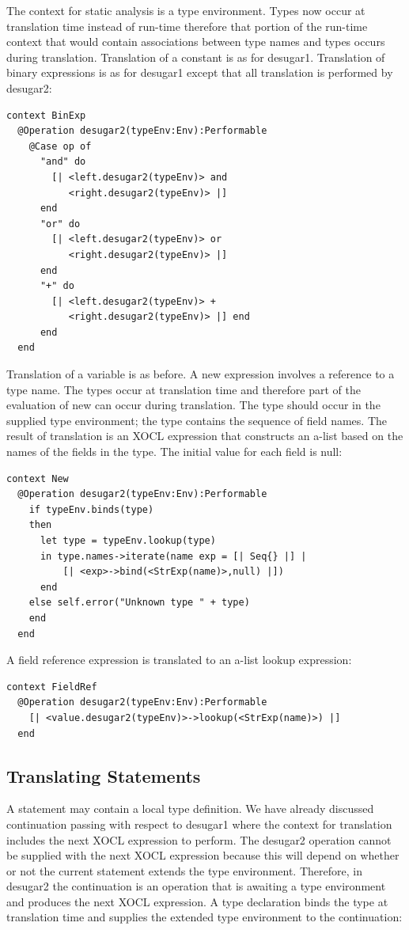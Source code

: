 The context for static analysis is a type environment. Types now occur
at translation time instead of run-time therefore that portion of
the run-time context that would contain associations between type
names and types occurs during translation. Translation of a constant
is as for desugar1. Translation of binary expressions is as for desugar1
except that all translation is performed by desugar2:

\begin{lstlisting}
context BinExp
  @Operation desugar2(typeEnv:Env):Performable
    @Case op of
      "and" do 
        [| <left.desugar2(typeEnv)> and
           <right.desugar2(typeEnv)> |] 
      end
      "or" do 
        [| <left.desugar2(typeEnv)> or 
           <right.desugar2(typeEnv)> |] 
      end 
      "+" do 
        [| <left.desugar2(typeEnv)> + 
           <right.desugar2(typeEnv)> |] end
      end
  end
\end{lstlisting}Translation of a variable is as before. A new expression involves
a reference to a type name. The types occur at translation time and
therefore part of the evaluation of new can occur during translation.
The type should occur in the supplied type environment; the type contains
the sequence of field names. The result of translation is an XOCL
expression that constructs an a-list based on the names of the fields
in the type. The initial value for each field is null:

\begin{lstlisting}
context New
  @Operation desugar2(typeEnv:Env):Performable
    if typeEnv.binds(type)
    then
      let type = typeEnv.lookup(type)
      in type.names->iterate(name exp = [| Seq{} |] | 
          [| <exp>->bind(<StrExp(name)>,null) |])
      end
    else self.error("Unknown type " + type)
    end
  end
\end{lstlisting}A field reference expression is translated to an a-list lookup expression:

\begin{lstlisting}
context FieldRef
  @Operation desugar2(typeEnv:Env):Performable
    [| <value.desugar2(typeEnv)>->lookup(<StrExp(name)>) |] 
  end
\end{lstlisting}
\subsection{Translating Statements}

A statement may contain a local type definition. We have already discussed
continuation passing with respect to desugar1 where the context for
translation includes the next XOCL expression to perform. The desugar2
operation cannot be supplied with the next XOCL expression because
this will depend on whether or not the current statement extends the
type environment. Therefore, in desugar2 the continuation is an operation
that is awaiting a type environment and produces the next XOCL expression.
A type declaration binds the type at translation time and supplies
the extended type environment to the continuation:

